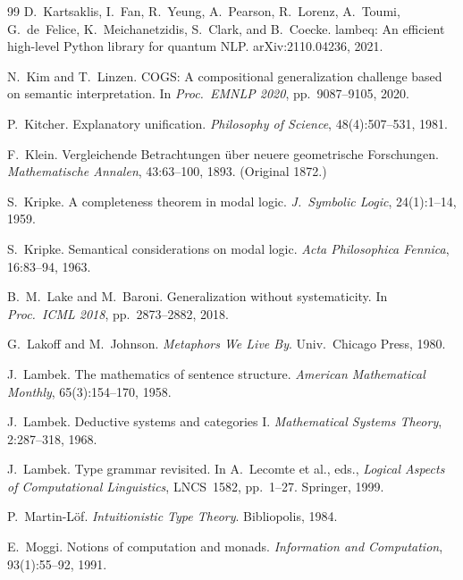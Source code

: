\documentclass[12pt,a4paper]{article}
\begin{document}
\begin{thebibliography}{99}
D.~Kartsaklis, I.~Fan, R.~Yeung, A.~Pearson, R.~Lorenz, A.~Toumi, G.~de~Felice, K.~Meichanetzidis, S.~Clark, and B.~Coecke.
\newblock lambeq: An efficient high-level Python library for quantum NLP.
\newblock arXiv:2110.04236, 2021.

N.~Kim and T.~Linzen.
\newblock COGS: A compositional generalization challenge based on semantic interpretation.
\newblock In \emph{Proc.\ EMNLP 2020}, pp.~9087--9105, 2020.

P.~Kitcher.
\newblock Explanatory unification.
\newblock \emph{Philosophy of Science}, 48(4):507--531, 1981.

F.~Klein.
\newblock Vergleichende Betrachtungen \"{u}ber neuere geometrische Forschungen.
\newblock \emph{Mathematische Annalen}, 43:63--100, 1893. (Original 1872.)

S.~Kripke.
\newblock A completeness theorem in modal logic.
\newblock \emph{J.\ Symbolic Logic}, 24(1):1--14, 1959.

S.~Kripke.
\newblock Semantical considerations on modal logic.
\newblock \emph{Acta Philosophica Fennica}, 16:83--94, 1963.

B.~M.~Lake and M.~Baroni.
\newblock Generalization without systematicity.
\newblock In \emph{Proc.\ ICML 2018}, pp.~2873--2882, 2018.

G.~Lakoff and M.~Johnson.
\newblock \emph{Metaphors We Live By}.
\newblock Univ.\ Chicago Press, 1980.

J.~Lambek.
\newblock The mathematics of sentence structure.
\newblock \emph{American Mathematical Monthly}, 65(3):154--170, 1958.

J.~Lambek.
\newblock Deductive systems and categories I.
\newblock \emph{Mathematical Systems Theory}, 2:287--318, 1968.

J.~Lambek.
\newblock Type grammar revisited.
\newblock In A.~Lecomte et al., eds., \emph{Logical Aspects of Computational Linguistics}, LNCS~1582, pp.~1--27. Springer, 1999.

P.~Martin-L\"{o}f.
\newblock \emph{Intuitionistic Type Theory}.
\newblock Bibliopolis, 1984.

E.~Moggi.
\newblock Notions of computation and monads.
\newblock \emph{Information and Computation}, 93(1):55--92, 1991.


\end{thebibliography}
\end{document}
